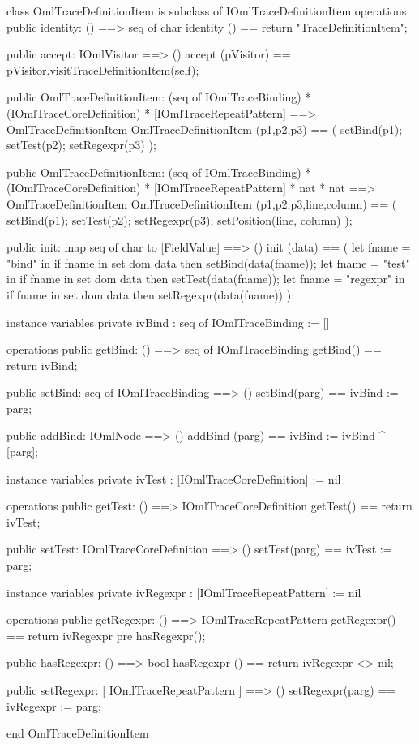 \begin{vdm_al}
class OmlTraceDefinitionItem is subclass of IOmlTraceDefinitionItem
operations
  public identity: () ==> seq of char
  identity () == return "TraceDefinitionItem";

  public accept: IOmlVisitor ==> ()
  accept (pVisitor) == pVisitor.visitTraceDefinitionItem(self);

  public OmlTraceDefinitionItem:
    (seq of IOmlTraceBinding) *
    (IOmlTraceCoreDefinition) *
    [IOmlTraceRepeatPattern] ==> OmlTraceDefinitionItem
  OmlTraceDefinitionItem (p1,p2,p3) == 
    ( setBind(p1);
      setTest(p2);
      setRegexpr(p3) );

  public OmlTraceDefinitionItem:
    (seq of IOmlTraceBinding) *
    (IOmlTraceCoreDefinition) *
    [IOmlTraceRepeatPattern] *
    nat *
    nat ==> OmlTraceDefinitionItem
  OmlTraceDefinitionItem (p1,p2,p3,line,column) == 
    ( setBind(p1);
      setTest(p2);
      setRegexpr(p3);
      setPosition(line, column) );

  public init: map seq of char to [FieldValue] ==> ()
  init (data) ==
    ( let fname = "bind" in
        if fname in set dom data
        then setBind(data(fname));
      let fname = "test" in
        if fname in set dom data
        then setTest(data(fname));
      let fname = "regexpr" in
        if fname in set dom data
        then setRegexpr(data(fname)) );

instance variables
  private ivBind : seq of IOmlTraceBinding := []

operations
  public getBind: () ==> seq of IOmlTraceBinding
  getBind() == return ivBind;

  public setBind: seq of IOmlTraceBinding ==> ()
  setBind(parg) == ivBind := parg;

  public addBind: IOmlNode ==> ()
  addBind (parg) == ivBind := ivBind ^ [parg];

instance variables
  private ivTest : [IOmlTraceCoreDefinition] := nil

operations
  public getTest: () ==> IOmlTraceCoreDefinition
  getTest() == return ivTest;

  public setTest: IOmlTraceCoreDefinition ==> ()
  setTest(parg) == ivTest := parg;

instance variables
  private ivRegexpr : [IOmlTraceRepeatPattern] := nil

operations
  public getRegexpr: () ==> IOmlTraceRepeatPattern
  getRegexpr() == return ivRegexpr
    pre hasRegexpr();

  public hasRegexpr: () ==> bool
  hasRegexpr () == return ivRegexpr <> nil;

  public setRegexpr: [ IOmlTraceRepeatPattern ] ==> ()
  setRegexpr(parg) == ivRegexpr := parg;

end OmlTraceDefinitionItem
\end{vdm_al}

